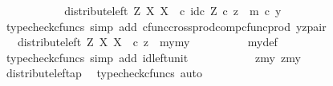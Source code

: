 \begin{isabellebody}
\ \ \ \ \ \ \isamarkupfalse%
\ \isamarkupfalse%
\ {\isachardoublequoteopen}{\isachardot}{\kern0pt}{\isachardot}{\kern0pt}{\isachardot}{\kern0pt}\ {\isacharequal}{\kern0pt}\ distribute{\isacharunderscore}{\kern0pt}left\ Z\ X\ X\ \ {\isasymcirc}\isactrlsub c\ {\isasymlangle}id\isactrlsub c\ Z\ {\isasymcirc}\isactrlsub c\ z\ {\isacharcomma}{\kern0pt}\ m\ {\isasymcirc}\isactrlsub c\ y{\isasymrangle}{\isachardoublequoteclose}\isanewline
\ \ \ \ \ \ \ \ \isamarkupfalse%
\ {\isacharparenleft}{\kern0pt}typecheck{\isacharunderscore}{\kern0pt}cfuncs{\isacharcomma}{\kern0pt}\ simp\ add{\isacharcolon}{\kern0pt}\ cfunc{\isacharunderscore}{\kern0pt}cross{\isacharunderscore}{\kern0pt}prod{\isacharunderscore}{\kern0pt}comp{\isacharunderscore}{\kern0pt}cfunc{\isacharunderscore}{\kern0pt}prod\ yz{\isacharunderscore}{\kern0pt}pair{\isacharparenright}{\kern0pt}\isanewline
\ \ \ \ \ \ \isamarkupfalse%
\ \isamarkupfalse%
\ {\isachardoublequoteopen}{\isachardot}{\kern0pt}{\isachardot}{\kern0pt}{\isachardot}{\kern0pt}\ {\isacharequal}{\kern0pt}\ distribute{\isacharunderscore}{\kern0pt}left\ Z\ X\ X\ \ {\isasymcirc}\isactrlsub c\ {\isasymlangle}z\ {\isacharcomma}{\kern0pt}\ {\isasymlangle}my{}{\isacharcomma}{\kern0pt}my{}{\isasymrangle}{\isasymrangle}{\isachardoublequoteclose}\isanewline
\ \ \ \ \ \ \ \ \isamarkupfalse%
\ my{\isacharunderscore}{\kern0pt}def\ \isamarkupfalse%
\ {\isacharparenleft}{\kern0pt}typecheck{\isacharunderscore}{\kern0pt}cfuncs{\isacharcomma}{\kern0pt}\ simp\ add{\isacharcolon}{\kern0pt}\ id{\isacharunderscore}{\kern0pt}left{\isacharunderscore}{\kern0pt}unit{}{\isacharparenright}{\kern0pt}\isanewline
\ \ \ \ \ \ \isamarkupfalse%
\ \isamarkupfalse%
\ {\isachardoublequoteopen}{\isachardot}{\kern0pt}{\isachardot}{\kern0pt}{\isachardot}{\kern0pt}\ {\isacharequal}{\kern0pt}\ {\isasymlangle}{\isasymlangle}z{\isacharcomma}{\kern0pt}my{}{\isasymrangle}{\isacharcomma}{\kern0pt}\ {\isasymlangle}z{\isacharcomma}{\kern0pt}my{}{\isasymrangle}{\isasymrangle}{\isachardoublequoteclose}\isanewline
\ \ \ \ \ \ \ \ \isamarkupfalse%
\ distribute{\isacharunderscore}{\kern0pt}left{\isacharunderscore}{\kern0pt}ap\ \isamarkupfalse%
\ {\isacharparenleft}{\kern0pt}typecheck{\isacharunderscore}{\kern0pt}cfuncs{\isacharcomma}{\kern0pt}\ auto{\isacharparenright}{\kern0pt}\isanewline
\ \ \ \ \ \ \isamarkupfalse%
\ \isamarkupfalse%

\end{isabellebody}
